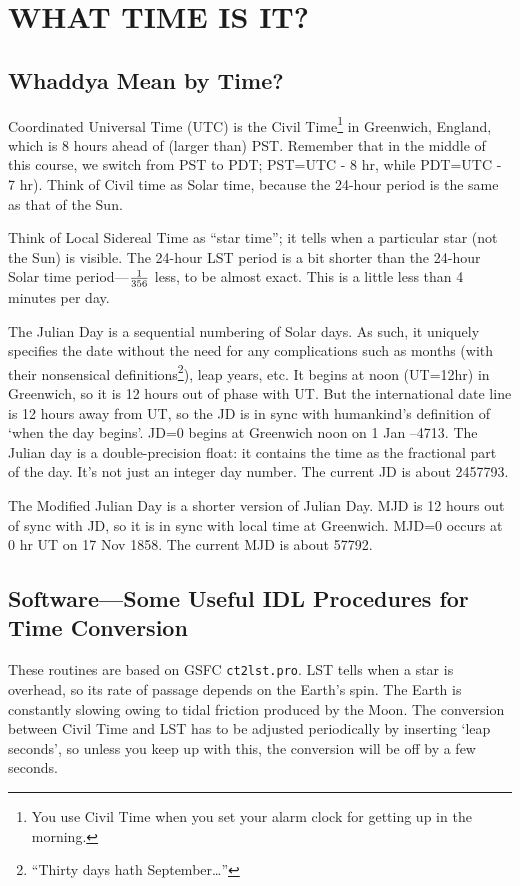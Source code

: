 \documentclass[12pt,preprint]{aastex}
\begin{document}
\section{WHAT TIME IS IT?} \label{jultime}

\subsection{Whaddya Mean by Time?}

Coordinated Universal Time (UTC) is the Civil Time\footnote{You use
  Civil Time when you set your alarm clock for getting up in the
  morning.} in Greenwich, England, which is 8 hours ahead of (larger
than) PST. Remember that in the middle of this course, we switch from
PST to PDT; PST=UTC - 8 hr, while PDT=UTC - 7 hr). Think of Civil time
as Solar time, because the 24-hour period is the same as that of the
Sun.

Think of Local Sidereal Time as ``star time''; it tells when a
particular star (not the Sun) is visible. The 24-hour LST period is a
bit shorter than the 24-hour Solar time period---$1 \over 356$ less, to
be almost exact. This is a little less than 4 minutes per day.

The Julian Day is a sequential numbering of Solar days. As such, it
uniquely specifies the date without the need for any complications such
as months (with their nonsensical definitions\footnote{``Thirty days
  hath September\dots''}), leap years, etc. It begins at noon (UT=12hr)
in Greenwich, so it is 12 hours out of phase with UT. But the
international date line is 12 hours away from UT, so the JD is in sync
with humankind's definition of `when the day begins'. JD=0 begins at
Greenwich noon on 1 Jan --4713.  The Julian day is a double-precision
float: it contains the time as the fractional part of the day. It's not
just an integer day number. The current JD is about 2457793.

The Modified Julian Day is a shorter version of Julian Day. MJD is 12
hours out of sync with JD, so it is in sync with local time at
Greenwich. MJD=0 occurs at 0 hr UT on 17 Nov 1858.  The current MJD is
about 57792.

\subsection{ Software---Some Useful IDL Procedures for Time Conversion}

These routines are based on GSFC {\tt ct2lst.pro}. LST tells when a star
is overhead, so its rate of passage depends on the Earth's spin. The
Earth is constantly slowing owing to tidal friction produced by the
Moon. The conversion between Civil Time and LST has to be adjusted
periodically by inserting `leap seconds', so unless you keep up with
this, the conversion will be off by a few seconds. 
\end{document}
